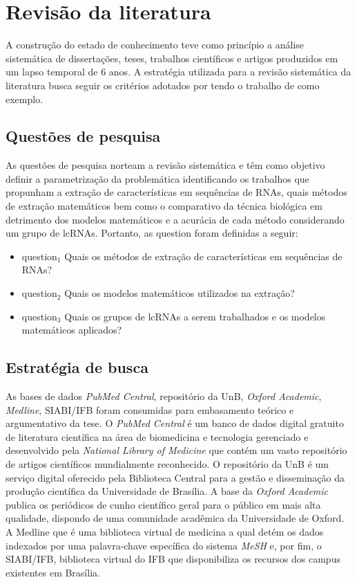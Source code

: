 \chapter{Revisão da literatura}

A construção do estado de conhecimento teve como princípio a análise sistemática de dissertações, teses, trabalhos científicos e artigos produzidos em um lapso temporal de 6 anos. A estratégia utilizada para a revisão sistemática da literatura busca seguir os critérios adotados por \cite{review-literature} tendo o trabalho de \cite{math-feature-bio} como exemplo.

\section{Questões de pesquisa}
As questões de pesquisa norteam a revisão sistemática e têm como objetivo definir a parametrização da problemática identificando os trabalhos que propunham a extração de características em sequências de RNAs, quais métodos de extração matemáticos bem como o comparativo da técnica biológica em detrimento dos modelos matemáticos e a acurácia de cada método considerando um grupo de lcRNAs. Portanto, as \ac{question} foram definidas a seguir:

\begin{itemize}
   \item\ac{question}$_{1}$ Quais os métodos de extração de características em sequências de RNAs?
  \item \ac{question}$_{2}$ Quais os modelos matemáticos utilizados na extração?
  \item \ac{question}$_{3}$ Quais os grupos de lcRNAs a serem trabalhados e os modelos matemáticos aplicados?
\end{itemize}

\section{Estratégia de busca}

As bases de dados \textit{PubMed Central}, repositório da UnB, \textit{Oxford Academic}, \textit{Medline}, SIABI/IFB foram consumidas para embasamento teórico e argumentativo da tese. O \textit{PubMed Central} é um banco de dados digital gratuito de literatura científica na área de biomedicina e tecnologia gerenciado e desenvolvido pela \textit{National Library of Medicine} que contém um vasto repositório de artigos científicos mundialmente reconhecido. O repositório da UnB é um serviço digital oferecido pela Biblioteca Central para a gestão e disseminação da produção científica da Universidade de Brasília. A base da \textit{Oxford Academic} publica os periódicos de cunho científico geral para o público em mais alta qualidade, dispondo de uma comunidade acadêmica da Universidade de Oxford. A Medline que é uma biblioteca virtual de medicina a qual detém os dados indexados por uma palavra-chave específica do sistema \textit{MeSH} e, por fim, o SIABI/IFB, biblioteca virtual do IFB que disponibiliza os recursos dos campus existentes em Brasília.

